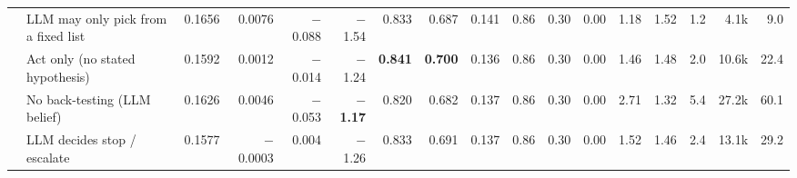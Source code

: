 \documentclass[11pt,a4paper]{article}
\begin{document}
\begin{landscape}
\begin{table}
{\begin{tabular}{llrrrrrrrrrrrrrrr}
 & LLM may only pick from a fixed list & 0.1656 & 0.0076 & $-$0.088 & $-$1.54 & 0.833 & 0.687 & 0.141 & 0.86 & 0.30 & 0.00 & 1.18 & 1.52 & 1.2 & 4.1k & 9.0 \\
 & Act only (no stated hypothesis) & 0.1592 & 0.0012 & $-$0.014 & $-$1.24 & \textbf{0.841} & \textbf{0.700} & 0.136 & 0.86 & 0.30 & 0.00 & 1.46 & 1.48 & 2.0 & 10.6k & 22.4 \\
 & No back-testing (LLM belief) & 0.1626 & 0.0046 & $-$0.053 & \textbf{$-$1.17} & 0.820 & 0.682 & 0.137 & 0.86 & 0.30 & 0.00 & 2.71 & 1.32 & 5.4 & 27.2k & 60.1 \\
 & LLM decides stop / escalate & 0.1577 & $-$0.0003 & 0.004 & $-$1.26 & 0.833 & 0.691 & 0.137 & 0.86 & 0.30 & 0.00 & 1.52 & 1.46 & 2.4 & 13.1k & 29.2 \\
\bottomrule
\end{tabular}}
\end{table}
\end{landscape}
\end{document}
